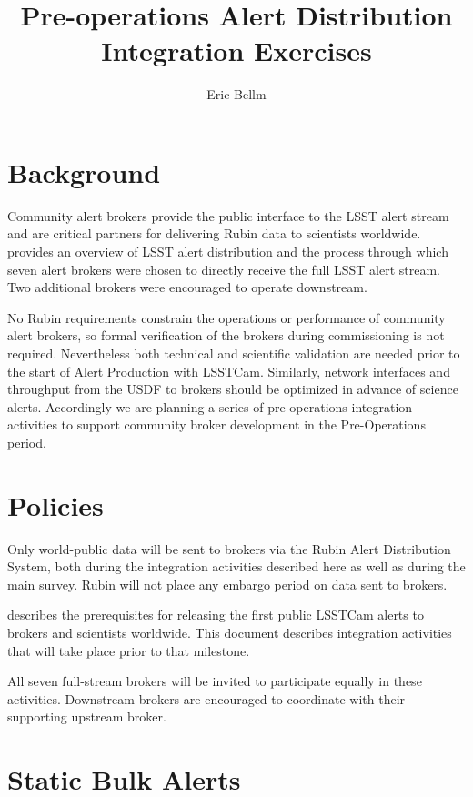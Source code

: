 \documentclass[DM,authoryear,toc]{lsstdoc}
\title{Pre-operations Alert Distribution Integration Exercises}
\author{%
Eric Bellm
}
\date{\vcsDate}
\begin{document}
\maketitle
\section{Background}

Community alert brokers provide the public interface to the LSST alert stream and are critical partners for delivering Rubin data to scientists worldwide.
 provides an overview of LSST alert distribution and the process through which seven alert brokers were chosen to directly receive the full LSST alert stream.
Two additional brokers were encouraged to operate downstream.

No Rubin requirements constrain the operations or performance of community alert brokers, so formal verification of the brokers during commissioning is not required.
Nevertheless both technical and scientific validation are needed prior to the start of Alert Production with LSSTCam.
Similarly, network interfaces and throughput from the USDF to brokers should be optimized in advance of science alerts.
Accordingly we are planning a series of pre-operations integration activities to support community broker development in the Pre-Operations period.

\section{Policies}

Only world-public data will be sent to brokers via the Rubin Alert Distribution System, both during the integration activities described here as well as during the main survey.
Rubin will not place any embargo period on data sent to brokers.

 describes the prerequisites for releasing the first public LSSTCam alerts to brokers and scientists worldwide.
This document describes integration activities that will take place prior to that milestone.

All seven full-stream brokers will be invited to participate equally in these activities.
Downstream brokers are encouraged to coordinate with their supporting upstream broker.

\section{Static Bulk Alerts}
\end{document}
